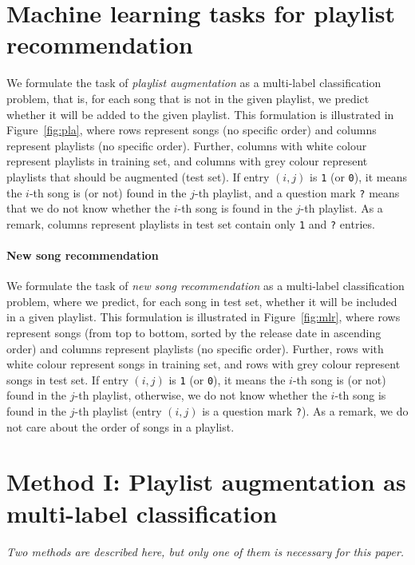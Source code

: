 \section{Machine learning tasks for playlist recommendation}

We formulate the task of \emph{playlist augmentation} as a multi-label classification problem,
that is, for each song that is not in the given playlist, 
we predict whether it will be added to the given playlist.
This formulation is illustrated in Figure~\ref{fig:pla},
where rows represent songs (no specific order) and columns represent playlists (no specific order).
Further, columns with white colour represent playlists in training set, 
and columns with grey colour represent playlists that should be augmented (\ie test set).
If entry $(i, j)$ is \texttt{1} (or \texttt{0}), 
it means the $i$-th song is (or not) found in the $j$-th playlist, 
and a question mark \texttt{?} means that we do not know whether the $i$-th song is found in the $j$-th playlist.
As a remark, columns represent playlists in test set contain only \texttt{1} and \texttt{?} entries.




\paragraph{New song recommendation}
We formulate the task of \emph{new song recommendation} as a multi-label classification problem, 
where we predict, for each song in test set,
whether it will be included in a given playlist.
This formulation is illustrated in Figure~\ref{fig:mlr},
where rows represent songs (from top to bottom, sorted by the release date in ascending order)
and columns represent playlists (no specific order).
Further, rows with white colour represent songs in training set, and rows with grey colour represent songs in test set.
If entry $(i, j)$ is \texttt{1} (or \texttt{0}), it means the $i$-th song is (or not) found in the $j$-th playlist,
otherwise, we do not know whether the $i$-th song is found in the $j$-th playlist (\ie entry $(i, j)$ is a question mark \texttt{?}).
As a remark, we do not care about the order of songs in a playlist.





\section{Method I: Playlist augmentation as multi-label classification}
{\it Two methods are described here, but only one of them is necessary for this paper.}


